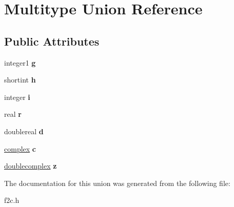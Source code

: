 \hypertarget{unionMultitype}{
\section{Multitype Union Reference}
\label{unionMultitype}
}
\subsection*{Public Attributes}
\begin{DoxyCompactItemize}
\item 
\hypertarget{unionMultitype_a6144d7589398ee0202ee7f4fbfad4f21}{
integer1 {\bfseries g}}
\label{unionMultitype_a6144d7589398ee0202ee7f4fbfad4f21}

\item 
\hypertarget{unionMultitype_a556d63188675caed2d40a14cbfe740e8}{
shortint {\bfseries h}}
\label{unionMultitype_a556d63188675caed2d40a14cbfe740e8}

\item 
\hypertarget{unionMultitype_a8b913dac6031042a8f5192ee033bb5f1}{
integer {\bfseries i}}
\label{unionMultitype_a8b913dac6031042a8f5192ee033bb5f1}

\item 
\hypertarget{unionMultitype_ab4eba1c6e83e32ee5b08b7550b46907c}{
real {\bfseries r}}
\label{unionMultitype_ab4eba1c6e83e32ee5b08b7550b46907c}

\item 
\hypertarget{unionMultitype_ad14eee30c207909f64d8adc2110dc8a1}{
doublereal {\bfseries d}}
\label{unionMultitype_ad14eee30c207909f64d8adc2110dc8a1}

\item 
\hypertarget{unionMultitype_a30e3bb4e990a88a087fad898df096868}{
\hyperlink{structcomplex}{complex} {\bfseries c}}
\label{unionMultitype_a30e3bb4e990a88a087fad898df096868}

\item 
\hypertarget{unionMultitype_aa031f83e1db7e8f751458cebe7b9d897}{
\hyperlink{structdoublecomplex}{doublecomplex} {\bfseries z}}
\label{unionMultitype_aa031f83e1db7e8f751458cebe7b9d897}

\end{DoxyCompactItemize}


The documentation for this union was generated from the following file:\begin{DoxyCompactItemize}
\item 
f2c.h\end{DoxyCompactItemize}
